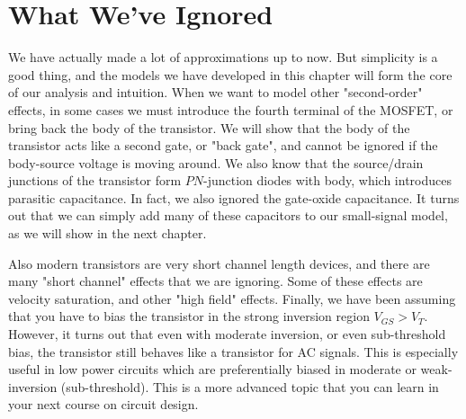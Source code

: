 \section{What We've Ignored}
We have actually made a lot of approximations up to now.  But simplicity is a good thing, and the models we have developed in this chapter will form the core of our analysis and intuition.  When we want to model other "second-order" effects, in some cases we must introduce the fourth terminal of the MOSFET, or bring back the body of the transistor.  We will show that the body of the transistor acts like a second gate, or "back gate", and cannot be ignored if the body-source voltage is moving around.  We also know that the source/drain junctions of the transistor form $PN$-junction diodes with body, which  introduces parasitic capacitance.  In fact, we also ignored the gate-oxide capacitance. It turns out that we can simply add many of these capacitors to our small-signal model, as we will show in the next chapter.

Also modern transistors are very short channel length devices, and there are many "short channel" effects that we are ignoring.  Some of these effects are velocity saturation, and other "high field" effects.  Finally, we have been assuming that you have to bias the transistor in the strong inversion region $V_{GS} > V_T$.  However, it turns out that even with moderate inversion, or even sub-threshold bias, the transistor still behaves like a transistor for AC signals.  This is especially useful in low power circuits which are preferentially biased in moderate or weak-inversion (sub-threshold).  This is a more advanced topic that you can learn in your next course on circuit design.
